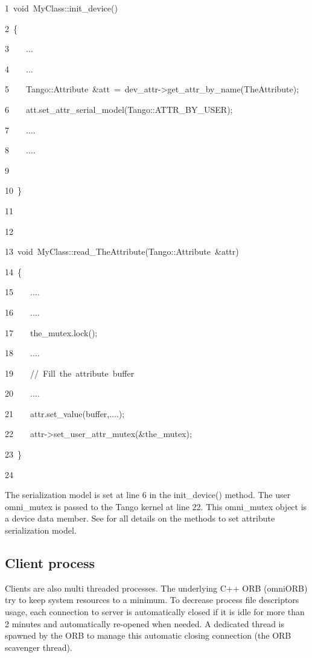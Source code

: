
\begin{lyxcode}
1~void~MyClass::init\_device()

2~\{

3~~~~...

4~~~~...

5~~~~Tango::Attribute~\&att~=~dev\_attr->get\_attr\_by\_name(\textquotedbl{}TheAttribute\textquotedbl{});

6~~~~att.set\_attr\_serial\_model(Tango::ATTR\_BY\_USER);

7~~~~....

8~~~~....

9~

10~\}

11~

12~

13~void~MyClass::read\_TheAttribute(Tango::Attribute~\&attr)

14~\{

15~~~~....

16~~~~....

17~~~~the\_mutex.lock();

18~~~~....

19~~~~//~Fill~the~attribute~buffer

20~~~~....

21~~~~attr.set\_value(buffer,....);

22~~~~attr->set\_user\_attr\_mutex(\&the\_mutex);

23~\}

24~
\end{lyxcode}


The serialization model is set at line 6 in the init\_device() method.
The user omni\_mutex is passed to the Tango kernel at line 22. This
omni\_mutex object is a device data member. See \cite{TANGO_ref_man}
for all details on the methods to set attribute serialization model.


\subsection{Client process}

Clients are also multi threaded processes. The underlying C++ ORB
(omniORB) try to keep system resources to a minimum. To decrease process
file descriptors usage, each connection to server is automatically
closed if it is idle for more than 2 minutes and automatically re-opened
when needed. A dedicated thread is spawned by the ORB to manage this
automatic closing connection (the ORB scavenger thread).

